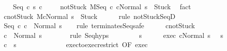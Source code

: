 \begin{isabellebody}
\isamarkupfalse%
\isanewline
\ \ \isamarkupfalse%
\ {\isacharparenleft}Seq\ c{}\ s\ c{}{\isacharparenright}\ \isanewline
\ \ \isamarkupfalse%
\ not{\isacharunderscore}Stuck{\isacharcolon}\ {\isachardoublequoteopen}{\isasymGamma}{\isacharbar}\isactrlbsub M\isactrlesub {\isasymturnstile}{\isasymlangle}Seq\ c{}\ c{}{\isacharcomma}Normal\ s\ {\isasymrangle}\ {\isasymRightarrow}{\isasymnotin}{\isacharbraceleft}Stuck{\isacharbraceright}{\isachardoublequoteclose}\ \isamarkupfalse%
\ fact\isanewline
\ \ \isamarkupfalse%
\ c{}{\isacharunderscore}notStuck{\isacharcolon}\ {\isachardoublequoteopen}{\isasymGamma}{\isacharbar}\isactrlbsub M\isactrlesub {\isasymturnstile}{\isasymlangle}c{}{\isacharcomma}Normal\ s\ {\isasymrangle}\ {\isasymRightarrow}{\isasymnotin}{\isacharbraceleft}Stuck{\isacharbraceright}{\isachardoublequoteclose}\isanewline
\ \ \ \ \isamarkupfalse%
\ {\isacharparenleft}rule\ notStuck{\isacharunderscore}SeqD{}{\isacharparenright}\isanewline
\ \ \isamarkupfalse%
\ {\isachardoublequoteopen}{\isasymGamma}{\isasymturnstile}Seq\ c{}\ c{}\ {\isasymdown}\ Normal\ s{\isachardoublequoteclose}\isanewline
\ \ \isamarkupfalse%
\ {\isacharparenleft}rule\ terminates{\isachardot}Seq{\isacharcomma}safe{\isacharparenright}\isanewline
\ \ \ \ \isamarkupfalse%
\ c{}{\isacharunderscore}notStuck\isanewline
\ \ \ \ \isamarkupfalse%
\ {\isachardoublequoteopen}{\isasymGamma}{\isasymturnstile}c{}\ {\isasymdown}\ Normal\ s{\isachardoublequoteclose}\isanewline
\ \ \ \ \ \ \isamarkupfalse%
\ {\isacharparenleft}rule\ Seq{\isachardot}hyps{\isacharparenright}\isanewline
\ \ \isamarkupfalse%
\isanewline
\ \ \ \ \isamarkupfalse%
\ s{\isacharprime}\isanewline
\ \ \ \ \isamarkupfalse%
\ exec{\isacharcolon}\ {\isachardoublequoteopen}{\isasymGamma}{\isasymturnstile}{\isasymlangle}c{}{\isacharcomma}Normal\ s\ {\isasymrangle}\ {\isasymRightarrow}\ s{\isacharprime}{\isachardoublequoteclose}\isanewline
\ \ \ \ \isamarkupfalse%
\ {\isachardoublequoteopen}{\isasymGamma}{\isasymturnstile}c{}\ {\isasymdown}\ s{\isacharprime}{\isachardoublequoteclose}\isanewline
\ \ \ \ \isamarkupfalse%
\ {\isacharminus}\isanewline
\ \ \ \ \ \ \isamarkupfalse%
\ exec{\isacharunderscore}to{\isacharunderscore}exec{\isacharunderscore}restrict\ {\isacharbrackleft}OF\ exec{\isacharbrackright}\ \isamarkupfalse%

\end{isabellebody}
